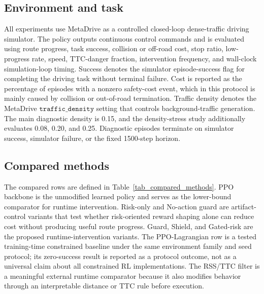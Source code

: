\documentclass[pdflatex,sn-mathphys-ay]{sn-jnl}
\begin{document}
\subsection{Environment and task}\label{sec_environment_task}
All experiments use MetaDrive as a controlled closed-loop dense-traffic driving simulator. The policy outputs continuous control commands and is evaluated using route progress, task success, collision or off-road cost, stop ratio, low-progress rate, speed, TTC-danger fraction, intervention frequency, and wall-clock simulation-loop timing. Success denotes the simulator episode-success flag for completing the driving task without terminal failure. Cost is reported as the percentage of episodes with a nonzero safety-cost event, which in this protocol is mainly caused by collision or out-of-road termination. Traffic density denotes the MetaDrive \(\texttt{traffic\_density}\) setting that controls background-traffic generation. The main diagnostic density is 0.15, and the density-stress study additionally evaluates 0.08, 0.20, and 0.25. Diagnostic episodes terminate on simulator success, simulator failure, or the fixed 1500-step horizon.

\subsection{Compared methods}\label{sec_compared_methods}
The compared rows are defined in Table~\ref{tab_compared_methods}. PPO backbone is the unmodified learned policy and serves as the lower-bound comparator for runtime intervention. Risk-only and No-action guard are artifact-control variants that test whether risk-oriented reward shaping alone can reduce cost without producing useful route progress. Guard, Shield, and Gated-risk are the proposed runtime-intervention variants. The PPO-Lagrangian row is a tested training-time constrained baseline under the same environment family and seed protocol; its zero-success result is reported as a protocol outcome, not as a universal claim about all constrained RL implementations. The RSS/TTC filter is a meaningful external runtime comparator because it also modifies behavior through an interpretable distance or TTC rule before execution.
\end{document}
